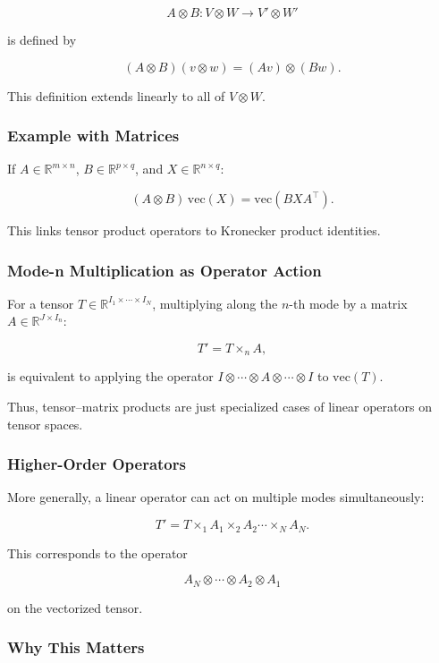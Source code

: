 \documentclass[
  letterpaper,
  DIV=11,
  numbers=noendperiod]{scrreprt}
\begin{document}
\[
A \otimes B : V \otimes W \to V' \otimes W'
\]

is defined by

\[
(A \otimes B)(v \otimes w) = (Av) \otimes (Bw).
\]

This definition extends linearly to all of \(V \otimes W\).

\subsubsection{Example with Matrices}\label{example-with-matrices}

If \(A \in \mathbb{R}^{m \times n}\), \(B \in \mathbb{R}^{p \times q}\),
and \(X \in \mathbb{R}^{n \times q}\):

\[
(A \otimes B)\,\mathrm{vec}(X) = \mathrm{vec}(BXA^\top).
\]

This links tensor product operators to Kronecker product identities.

\subsubsection{Mode-n Multiplication as Operator
Action}\label{mode-n-multiplication-as-operator-action}

For a tensor \(T \in \mathbb{R}^{I_1 \times \cdots \times I_N}\),
multiplying along the \(n\)-th mode by a matrix
\(A \in \mathbb{R}^{J \times I_n}\):

\[
T' = T \times_n A,
\]

is equivalent to applying the operator
\(I \otimes \cdots \otimes A \otimes \cdots \otimes I\) to
\(\mathrm{vec}(T)\).

Thus, tensor--matrix products are just specialized cases of linear
operators on tensor spaces.

\subsubsection{Higher-Order Operators}\label{higher-order-operators}

More generally, a linear operator can act on multiple modes
simultaneously:

\[
T' = T \times_1 A_1 \times_2 A_2 \cdots \times_N A_N.
\]

This corresponds to the operator

\[
A_N \otimes \cdots \otimes A_2 \otimes A_1
\]

on the vectorized tensor.

\subsubsection{Why This Matters}\label{why-this-matters-29}
\end{document}
